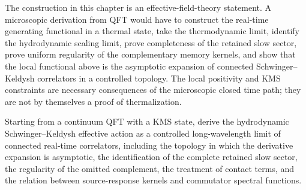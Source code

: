 The construction in this chapter is an effective-field-theory statement.  A
microscopic derivation from QFT would have to construct the real-time
generating functional in a thermal state, take the thermodynamic limit,
identify the hydrodynamic scaling limit, prove completeness of the retained
slow sector, prove uniform regularity of the complementary memory kernels, and
show that the local functional above is the asymptotic expansion of connected
Schwinger--Keldysh correlators in a controlled topology.  The local
positivity and KMS constraints are necessary consequences of the microscopic
closed time path; they are not by themselves a proof of thermalization.

\begin{openproblem}
\label{op:microscopic-sk-hydrodynamic-action}
Starting from a continuum QFT with a KMS state, derive the hydrodynamic
Schwinger--Keldysh effective action as a controlled long-wavelength limit of
connected real-time correlators, including the topology in which the
derivative expansion is asymptotic, the identification of the complete
retained slow sector, the regularity of the omitted complement, the treatment
of contact terms, and the relation between source-response kernels and
commutator spectral functions.
\end{openproblem}
